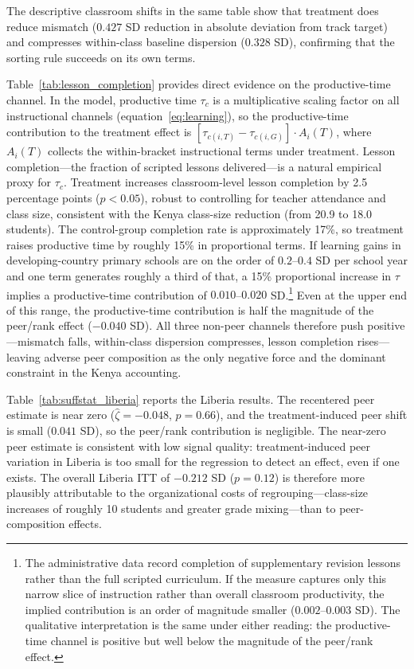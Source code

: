 \documentclass[11pt]{article}
\begin{document}
The descriptive classroom shifts in the same table show that treatment does reduce mismatch ($0.427$ SD reduction in absolute deviation from track target) and compresses within-class baseline dispersion ($0.328$ SD), confirming that the sorting rule succeeds on its own terms.

Table~\ref{tab:lesson_completion} provides direct evidence on the productive-time channel. In the model, productive time $\tau_c$ is a multiplicative scaling factor on all instructional channels (equation~\ref{eq:learning}), so the productive-time contribution to the treatment effect is $[\tau_{c(i,T)} - \tau_{c(i,G)}] \cdot A_i(T)$, where $A_i(T)$ collects the within-bracket instructional terms under treatment. Lesson completion---the fraction of scripted lessons delivered---is a natural empirical proxy for $\tau_c$. Treatment increases classroom-level lesson completion by 2.5 percentage points ($p < 0.05$), robust to controlling for teacher attendance and class size, consistent with the Kenya class-size reduction (from 20.9 to 18.0 students). The control-group completion rate is approximately 17\%, so treatment raises productive time by roughly 15\% in proportional terms. If learning gains in developing-country primary schools are on the order of $0.2$--$0.4$ SD per school year \citep[e.g.,][]{muralidharan2019disrupting} and one term generates roughly a third of that, a 15\% proportional increase in $\tau$ implies a productive-time contribution of $0.010$--$0.020$ SD.\footnote{The administrative data record completion of supplementary revision lessons rather than the full scripted curriculum. If the measure captures only this narrow slice of instruction rather than overall classroom productivity, the implied contribution is an order of magnitude smaller ($0.002$--$0.003$ SD). The qualitative interpretation is the same under either reading: the productive-time channel is positive but well below the magnitude of the peer/rank effect.} Even at the upper end of this range, the productive-time contribution is half the magnitude of the peer/rank effect ($-0.040$ SD). All three non-peer channels therefore push positive---mismatch falls, within-class dispersion compresses, lesson completion rises---leaving adverse peer composition as the only negative force and the dominant constraint in the Kenya accounting.

Table~\ref{tab:suffstat_liberia} reports the Liberia results. The recentered peer estimate is near zero ($\hat{\zeta} = -0.048$, $p = 0.66$), and the treatment-induced peer shift is small ($0.041$ SD), so the peer/rank contribution is negligible. The near-zero peer estimate is consistent with low signal quality: treatment-induced peer variation in Liberia is too small for the regression to detect an effect, even if one exists. The overall Liberia ITT of $-0.212$ SD ($p = 0.12$) is therefore more plausibly attributable to the organizational costs of regrouping---class-size increases of roughly 10 students and greater grade mixing---than to peer-composition effects.
\end{document}
